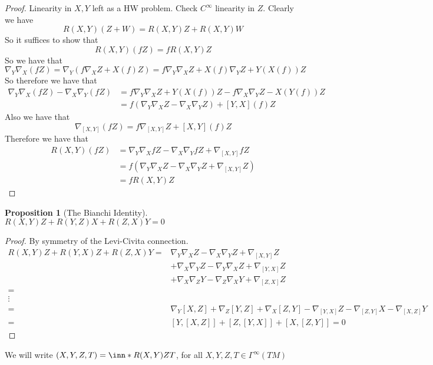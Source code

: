 \documentclass[a4paper]{article}
\newtheorem*{prop}{Proposition}
\begin{document}
\begin{proof}
 Linearity in $X,Y$ left as a HW problem. Check $C^\infty$ linearity in $Z$. Clearly we have 
 \[
   R(X,Y)(Z+W) = R(X,Y)Z + R(X,Y)W
 \]
 So it suffices to show that
 \[
   R(X,Y)(fZ) = fR(X,Y)Z
 \]
 So we have that
 \[
   \nabla_Y \nabla_X (fZ) = \nabla_Y(f\nabla_X Z + X(f)Z) = f\nabla_Y\nabla_X Z + X(f)\nabla_Y Z + Y(X(f))Z
 \]
 So therefore we have that
 \[
   \begin{aligned}
     \nabla_Y \nabla_X (fZ) - \nabla_X \nabla_Y (fZ) &= f\nabla_Y\nabla_X Z + Y(X(f))Z - f\nabla_X\nabla_YZ - X(Y(f))Z \\
                                                     &= f \left( \nabla_Y \nabla_X Z - \nabla_X \nabla_Y Z \right) + \left[ Y,X \right](f) Z
   \end{aligned}
 \]
 Also we have that
 \[
   \nabla_{[X,Y]}(fZ) = f \nabla_{[X,Y]} Z + [X,Y](f) Z
 \]
 Therefore we have that
 \[
   \begin{aligned}
     R(X,Y)(fZ) &= \nabla_Y \nabla_X fZ - \nabla_X \nabla_Y fZ + \nabla_{[X,Y]} fZ \\
                &= f(\nabla_Y \nabla_X Z - \nabla_X \nabla_Y Z + \nabla_{[X,Y]} Z) \\
                &= f R(X,Y)Z
   \end{aligned}
 \]
\end{proof}

 \begin{prop}[The Bianchi Identity]
   $R(X,Y)Z + R(Y,Z)X + R(Z,X)Y = 0$
 \end{prop}

 \begin{proof}
   By symmetry of the Levi-Civita connection. 
   \[
     \begin{aligned}
       R(X,Y)Z + R(Y,X)Z + R(Z,X)Y =& \nabla_Y \nabla_X Z - \nabla_X \nabla_Y Z + \nabla_{[X,Y]} Z \\
                                    &+ \nabla_X \nabla_Y Z - \nabla_Y \nabla_X Z + \nabla_{[Y,X]} Z\\
                                    &+ \nabla_X \nabla_Z Y - \nabla_Z \nabla_X Y + \nabla_{[Z,X]} Z\\
       =& \\
                                    \vdots \\
       =& \nabla_Y[X,Z] + \nabla_Z [Y,Z] + \nabla_X[Z,Y] - \nabla_{[Y,X]}Z  - \nabla_{[Z,Y]}X - \nabla_{[X,Z]}Y \\
       =& [Y,[X,Z]] + [Z,[Y,X]] + [X,[Z,Y]] = 0
     \end{aligned}
   \]
 \end{proof}
 We will write $(X,Y,Z,T) = \inn*{R(X,Y)Z}{T}$, for all $X,Y,Z,T \in \Gamma^{\infty}(TM)$
\end{document}
